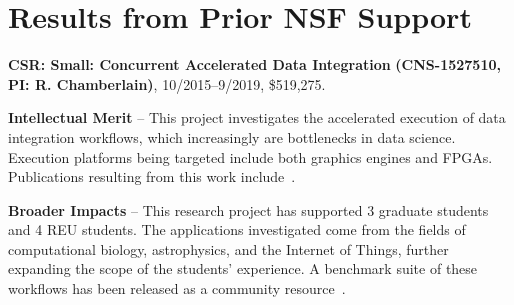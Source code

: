 \section{Results from Prior NSF Support}
\label{sec:prior}

\noindent
{\large\bf CSR: Small: Concurrent Accelerated Data Integration}
{\bf (CNS-1527510,
PI: R. Chamberlain)}, 
10/2015--9/2019, \$519,275.  

\textbf{Intellectual Merit} -- This project investigates the
accelerated execution of data integration workflows, which
increasingly are bottlenecks in data science. Execution platforms
being targeted include both graphics engines and FPGAs.  Publications
resulting from this work include~\cite{dibs,c17,mgc16,js16}.

\textbf{Broader Impacts} -- This research project has supported 3
graduate students and 4 REU students.  The applications investigated
come from the fields of computational biology, astrophysics, and the
Internet of Things, further expanding the scope of the students'
experience.  A benchmark suite of these workflows has been released
as a community resource~\cite{dibsv1}.

